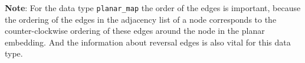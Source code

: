 {\bf Note}:
For the data type {\tt planar\_map} the order of the edges is important,
because the ordering of the edges in the adjacency list of a node
corresponds to the counter-clockwise ordering of these edges around the node
in the planar embedding. And the information about reversal edges is also
vital for this data type.



